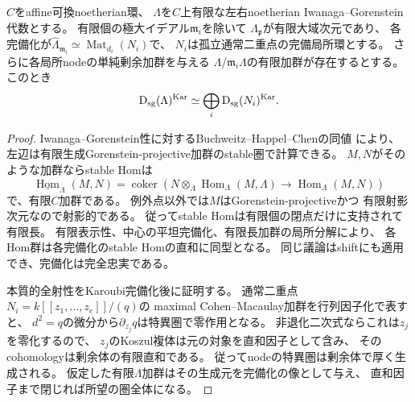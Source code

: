 \begin{lemma}[孤立行列nodeの完備化と直和分解]
\label{lem:quotient-completion}
$C$をaffine可換noetherian環、
$\Lambda$を$C$上有限な左右noetherian Iwanaga--Gorenstein代数とする。
有限個の極大イデアル$\mathfrak m_i$を除いて
$\Lambda_{\mathfrak p}$が有限大域次元であり、
各完備化が$\widehat\Lambda_{\mathfrak m_i}\simeq
\operatorname{Mat}_{d_i}(N_i)$で、
$N_i$は孤立通常二重点の完備局所環とする。
さらに各局所nodeの単純剰余加群を与える
$\Lambda/\mathfrak m_i\Lambda$の有限加群が存在するとする。
このとき
\[
 \operatorname{D}_{\mathrm{sg}}(\Lambda)^{\mathrm{Kar}}\simeq
 \bigoplus_i\operatorname{D}_{\mathrm{sg}}(N_i)^{\mathrm{Kar}} .
\]
\end{lemma}
\begin{proof}
Iwanaga--Gorenstein性に対するBuchweitz--Happel--Chenの同値
\cite{ChenRelativeSingcat}により、
左辺は有限生成Gorenstein-projective加群のstable圏で計算できる。
$M,N$がそのような加群ならstable Homは
\[
 \underline{\operatorname{Hom}}_\Lambda(M,N)=
 \operatorname{coker}\!\left(
 N\otimes_\Lambda\operatorname{Hom}_\Lambda(M,\Lambda)
 \longrightarrow\operatorname{Hom}_\Lambda(M,N)\right)
\]
で、有限$C$加群である。
例外点以外では$M$はGorenstein-projectiveかつ
有限射影次元なので射影的である。
従ってstable Homは有限個の閉点だけに支持されて有限長。
有限表示性、中心の平坦完備化、有限長加群の局所分解により、
各Hom群は各完備化のstable Homの直和に同型となる。
同じ議論はshiftにも適用でき、完備化は完全忠実である。

本質的全射性をKaroubi完備化後に証明する。
通常二重点$N_i=k[[z_1,\ldots,z_e]]/(q)$の
maximal Cohen--Macaulay加群を行列因子化で表すと、
$d^2=q$の微分から$\partial_{z_j}q$は特異圏で零作用となる。
非退化二次式ならこれは$z_j$を零化するので、
$z_j$のKoszul複体は元の対象を直和因子として含み、
そのcohomologyは剰余体の有限直和である。
従ってnodeの特異圏は剰余体で厚く生成される。
仮定した有限$\Lambda$加群はその生成元を完備化の像として与え、
直和因子まで閉じれば所望の圏全体になる。
\end{proof}

